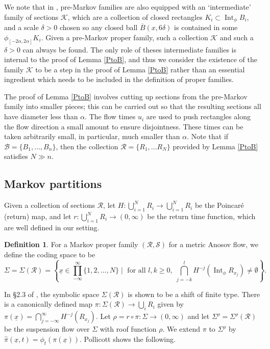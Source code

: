 \documentclass[11pt]{article}
\let\mathcal\mathscr
\let\sep\mid
\theoremstyle{definition}
\newtheorem{defn}[thm]{Definition}
\numberwithin{equation}{section}
\DeclareMathOperator{\Int}{Int}
\newcommand\KKK{\mathcal K}
\newcommand\BBB{\mathcal B}
\newcommand\RRR{\mathcal R}
\newcommand\SSS{\mathcal S}
\begin{document}
We note that in \cite{bowen-symbolic, pollicott}, pre-Markov families are also equipped with an `intermediate' family of sections $\KKK$, which are a collection of closed rectangles $K_i \subset \Int_\phi B_i$, and a scale $\delta>0$ chosen so any closed ball $\overline B(x, 6\delta)$ is contained in some $\phi_{[-2 \alpha, 2 \alpha]}K_i$. Given a pre-Markov proper family, such a collection $\KKK$ and such a $\delta>0$ can always be found. The only role of theses intermediate families is internal to the proof of Lemma \ref{PtoB}, and thus we consider the existence of the family $\KKK$ to be a step in the proof of Lemma \ref{PtoB} rather than an essential ingredient which needs to be included in the definition of proper families.

The proof of Lemma \ref{PtoB} involves cutting up sections from the pre-Markov family into smaller pieces; this can be carried out so that the resulting sections all have diameter less than $\alpha$. The flow times $u_i$ are used to push rectangles along the flow direction a small amount to ensure disjointness. These times can be taken arbitrarily small, in particular, much smaller than $\alpha$. Note that if $\BBB = \{B_1, \ldots, B_n\}$, then the collection $\RRR= \{R_1, \ldots R_N\}$ provided by Lemma \ref{PtoB} satisfies $N \gg  n$.

\subsection{Markov partitions}

Given a collection of sections $\RRR$, let $H: \bigcup_{i=1}^N R_i \to \bigcup_{i=1}^N R_i$ be the Poincaré (return) map, and let $r: \bigcup_{i=1}^N R_i \to (0, \infty)$ be the return time function, which are well defined in our setting.

\begin{defn}
For a Markov proper family $(\RRR, \SSS)$ for a metric Anosov flow, we define the coding space to be
\[\textstyle \Sigma=\Sigma(\RRR)= \left \{ \underline x \in \prod_{-\infty}^{\infty}\{1, 2, \ldots, N\} \sep \text{ for all } l, k \geq 0,\; \bigcap_{j=-k}^l H^{-j}( \Int_\phi R_{x_j}) \neq \emptyset \right \}. \]
\end{defn}

In \S2.3 of \cite{pollicott}, the symbolic space $\Sigma(\RRR)$ is shown to be a shift of finite type. There is a canonically defined map $\pi: \Sigma(\RRR) \to \bigcup_i R_i$ given by $\pi(\underline x) = \bigcap_{j=-\infty}^\infty H^{-j}(R_{x_j})$. Let $\rho= r \circ \pi: \Sigma \to (0, \infty)$ and let $\Sigma^\rho=\Sigma^\rho(\RRR)$ be the suspension flow over $\Sigma$ with roof function $\rho$. We extend $\pi$ to $\Sigma^\rho$ by $\hat \pi(\underline x, t) = \phi_t(\pi(\underline x))$. Pollicott shows the following.
\end{document}
